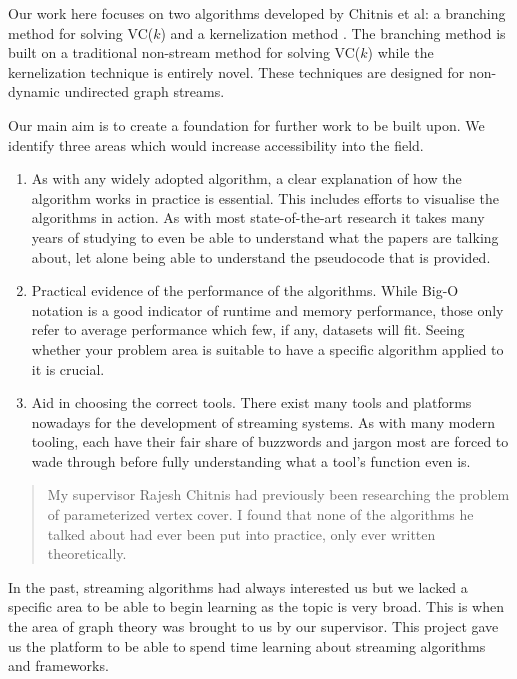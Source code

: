 Our work here focuses on two algorithms developed by Chitnis et
al: a branching method for solving VC(\(k\)) \cite{chitnis2019towards} and a
kernelization method \cite{chitnis2015parameterized}. The branching method is built
on a traditional non-stream method for solving VC(\(k\)) while the
kernelization technique is entirely novel. These techniques are designed
for non-dynamic undirected graph streams.

Our main aim is to create a foundation for further work to be built
upon. We identify three areas which would increase accessibility into
the field.

\begin{enumerate}
    \item
          As with any widely adopted algorithm, a clear explanation of how the
          algorithm works in practice is essential. This includes efforts to
          visualise the algorithms in action. As with most state-of-the-art
          research it takes many years of studying to even be able to understand
          what the papers are talking about, let alone being able to understand
          the pseudocode that is provided.
    \item
          Practical evidence of the performance of the algorithms. While Big-O
          notation is a good indicator of runtime and memory performance, those
          only refer to average performance which few, if any, datasets will
          fit. Seeing whether your problem area is suitable to have a specific
          algorithm applied to it is crucial.
    \item
          Aid in choosing the correct tools. There exist many tools and
          platforms nowadays for the development of streaming systems. As with
          many modern tooling, each have their fair share of buzzwords and
          jargon most are forced to wade through before fully understanding what
          a tool's function even is.
\end{enumerate}

\begin{quote}
    My supervisor Rajesh Chitnis had previously been researching the problem
    of parameterized vertex cover. I found that none of the algorithms he
    talked about had ever been put into practice, only ever written
    theoretically.
\end{quote}

In the past, streaming algorithms had always interested us but we lacked
a specific area to be able to begin learning as the topic is very broad.
This is when the area of graph theory was brought to us by our
supervisor. This project gave us the platform to be able to spend time
learning about streaming algorithms and frameworks.